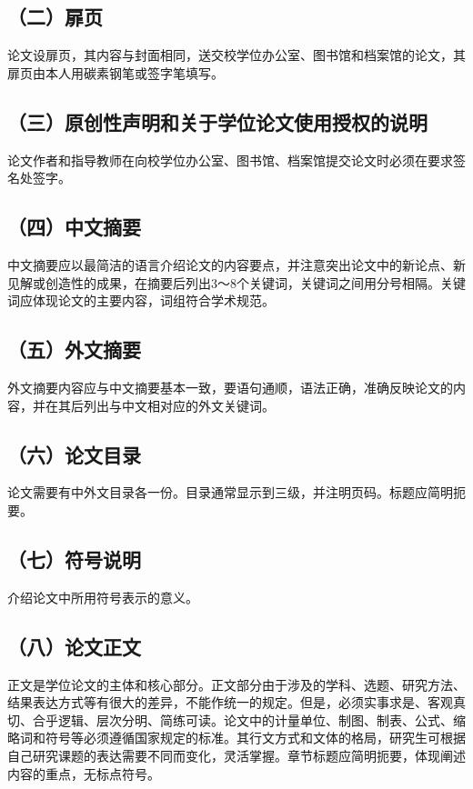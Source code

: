 \subsection{（二）扉页}
论文设扉页，其内容与封面相同，送交校学位办公室、图书馆和档案馆的论文，其扉页由本人用碳素钢笔或签字笔填写。

\subsection{（三）原创性声明和关于学位论文使用授权的说明}
论文作者和指导教师在向校学位办公室、图书馆、档案馆提交论文时必须在要求签名处签字。

\subsection{（四）中文摘要}
中文摘要应以最简洁的语言介绍论文的内容要点，并注意突出论文中的新论点、新见解或创造性的成果，在摘要后列出3～8个关键词，关键词之间用分号相隔。关键词应体现论文的主要内容，词组符合学术规范。

\subsection{（五）外文摘要}
外文摘要内容应与中文摘要基本一致，要语句通顺，语法正确，准确反映论文的内容，并在其后列出与中文相对应的外文关键词。

\subsection{（六）论文目录}
论文需要有中外文目录各一份。目录通常显示到三级，并注明页码。标题应简明扼要。

\subsection{（七）符号说明}
介绍论文中所用符号表示的意义。

\subsection{（八）论文正文}
正文是学位论文的主体和核心部分。正文部分由于涉及的学科、选题、研究方法、结果表达方式等有很大的差异，不能作统一的规定。但是，必须实事求是、客观真切、合乎逻辑、层次分明、简练可读。论文中的计量单位、制图、制表、公式、缩略词和符号等必须遵循国家规定的标准。其行文方式和文体的格局，研究生可根据自己研究课题的表达需要不同而变化，灵活掌握。章节标题应简明扼要，体现阐述内容的重点，无标点符号。

